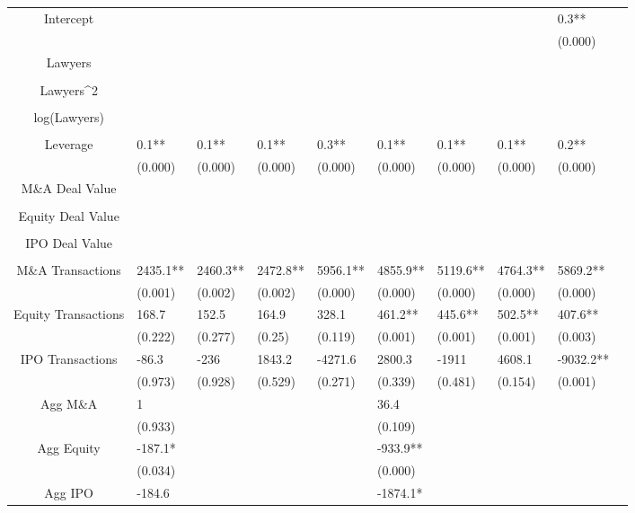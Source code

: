 \documentclass{article}
\begin{document}
\begin{table}[H]
\begin{tabular}{|clllllllll|}
Intercept &  &  &  &  &  &  &  & 0.3** & \\ 
   &  &  &  &  &  &  &  & (0.000) & \\ 
  Lawyers &  &  &  &  &  &  &  &  & \\ 
   &  &  &  &  &  &  &  &  & \\ 
  Lawyers^2 &  &  &  &  &  &  &  &  & \\ 
   &  &  &  &  &  &  &  &  & \\ 
  log(Lawyers) &  &  &  &  &  &  &  &  & \\ 
   &  &  &  &  &  &  &  &  & \\ 
  Leverage & 0.1** & 0.1** & 0.1** & 0.3** & 0.1** & 0.1** & 0.1** & 0.2** & \\ 
   & (0.000) & (0.000) & (0.000) & (0.000) & (0.000) & (0.000) & (0.000) & (0.000) & \\ 
  M\&A Deal Value &  &  &  &  &  &  &  &  & \\ 
   &  &  &  &  &  &  &  &  & \\ 
  Equity Deal Value &  &  &  &  &  &  &  &  & \\ 
   &  &  &  &  &  &  &  &  & \\ 
  IPO Deal Value &  &  &  &  &  &  &  &  & \\ 
   &  &  &  &  &  &  &  &  & \\ 
  M\&A Transactions & 2435.1** & 2460.3** & 2472.8** & 5956.1** & 4855.9** & 5119.6** & 4764.3** & 5869.2** & \\ 
   & (0.001) & (0.002) & (0.002) & (0.000) & (0.000) & (0.000) & (0.000) & (0.000) & \\ 
  Equity Transactions & 168.7 & 152.5 & 164.9 & 328.1 & 461.2** & 445.6** & 502.5** & 407.6** & \\ 
   & (0.222) & (0.277) & (0.25) & (0.119) & (0.001) & (0.001) & (0.001) & (0.003) & \\ 
  IPO Transactions & -86.3 & -236 & 1843.2 & -4271.6 & 2800.3 & -1911 & 4608.1 & -9032.2** & \\ 
   & (0.973) & (0.928) & (0.529) & (0.271) & (0.339) & (0.481) & (0.154) & (0.001) & \\ 
  Agg M\&A & 1 &  &  &  & 36.4 &  &  &  & \\ 
   & (0.933) &  &  &  & (0.109) &  &  &  & \\ 
  Agg Equity & -187.1* &  &  &  & -933.9** &  &  &  & \\ 
   & (0.034) &  &  &  & (0.000) &  &  &  & \\ 
  Agg IPO & -184.6 &  &  &  & -1874.1* &  &  &  & \\ 

\end{tabular}
\end{table}
\end{document}
